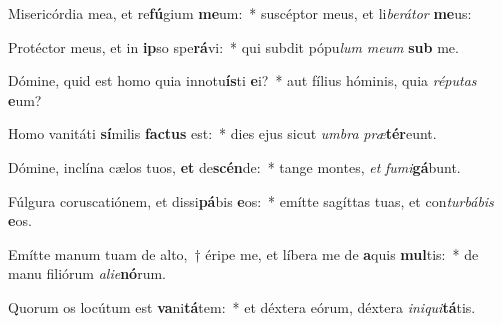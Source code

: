 \item Misericórdia mea, et re\textbf{fú}gium \textbf{me}um:~* suscéptor meus, et li\textit{be}\textit{rá}\textit{tor} \textbf{me}us:
\item Protéctor meus, et in \textbf{ip}so spe\textbf{rá}vi:~* qui subdit pópu\textit{lum} \textit{me}\textit{um} \textbf{sub} me.
\item Dómine, quid est homo quia innotu\textbf{ís}ti \textbf{e}i?~* aut fílius hóminis, quia \textit{ré}\textit{pu}\textit{tas} \textbf{e}um?
\item Homo vanitáti \textbf{sí}milis \textbf{fac}\textbf{tus} est:~* dies ejus sicut \textit{um}\textit{bra} \textit{præ}\textbf{tér}eunt.
\item Dómine, inclína cælos tuos, \textbf{et} de\textbf{scén}de:~* tange montes, \textit{et} \textit{fu}\textit{mi}\textbf{gá}bunt.
\item Fúlgura coruscatiónem, et dissi\textbf{pá}bis \textbf{e}os:~* emítte sagíttas tuas, et con\textit{tur}\textit{bá}\textit{bis} \textbf{e}os.
\item Emítte manum tuam de alto,~† éripe me, et líbera me de \textbf{a}quis \textbf{mul}tis:~* de manu filiórum \textit{a}\textit{li}\textit{e}\textbf{nó}rum.
\item Quorum os locútum est \textbf{va}ni\textbf{tá}tem:~* et déxtera eórum, déxtera \textit{in}\textit{i}\textit{qui}\textbf{tá}tis.
